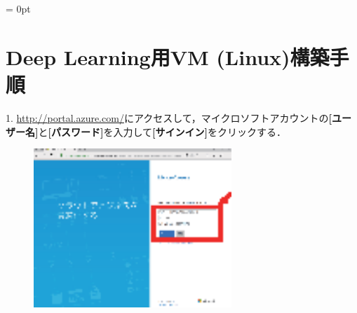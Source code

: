 
\setcounter{section}{0}

\parindent = 0pt

\section*{Deep Learning用VM (Linux)構築手順}
1. \url{http://portal.azure.com/}にアクセスして，マイクロソフトアカウントの{\bf[ユーザー名]}と{\bf[パスワード]}を入力して{\bf[サインイン]}をクリックする．

\begin{figure}[ht]
	\begin{center}
		\includegraphics[height=6cm]
		{images/YamasakiLab/azure/pic01.eps}
	\end{center}
\end{figure}

